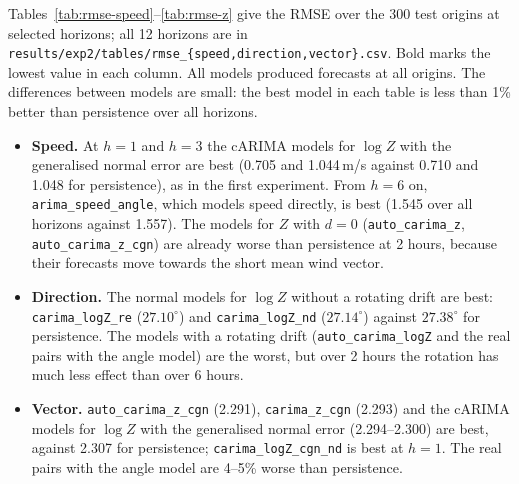 \documentclass[11pt,a4paper]{article}
\newcommand{\code}[1]{\texttt{#1}}
\newcommand{\1}{\mathbf{1}}
\begin{document}
Tables~\ref{tab:rmse-speed}--\ref{tab:rmse-z} give the RMSE over the 300 test origins at selected
horizons; all 12 horizons are in \code{results/exp2/tables/rmse\_\{speed,direction,vector\}.csv}.
Bold marks the lowest value in each column. All models produced forecasts at all origins. The
differences between models are small: the best model in each table is less than 1\% better than
persistence over all horizons.
\begin{itemize}
  \item \textbf{Speed.} At $h = 1$ and $h = 3$ the cARIMA models for $\log Z$ with the generalised
    normal error are best (0.705 and 1.044\,m/s against 0.710 and 1.048 for persistence), as in the
    first experiment. From $h = 6$ on, \code{arima\_speed\_angle}, which models speed directly, is
    best (1.545 over all horizons against 1.557). The models for $Z$ with $d = 0$
    (\code{auto\_carima\_z}, \code{auto\_carima\_z\_cgn}) are already worse than persistence at
    2 hours, because their forecasts move towards the short mean wind vector.
  \item \textbf{Direction.} The normal models for $\log Z$ without a rotating drift are best:
    \code{carima\_logZ\_re} ($27.10^\circ$) and \code{carima\_logZ\_nd} ($27.14^\circ$) against
    $27.38^\circ$ for persistence. The models with a rotating drift
    (\code{auto\_carima\_logZ} and the real pairs with the angle model) are the worst, but over 2
    hours the rotation has much less effect than over 6 hours.
  \item \textbf{Vector.} \code{auto\_carima\_z\_cgn} (2.291), \code{carima\_z\_cgn} (2.293) and the
    cARIMA models for $\log Z$ with the generalised normal error (2.294--2.300) are best, against
    2.307 for persistence; \code{carima\_logZ\_cgn\_nd} is best at $h = 1$. The real pairs with the
    angle model are 4--5\% worse than persistence.
\end{itemize}
\end{document}
